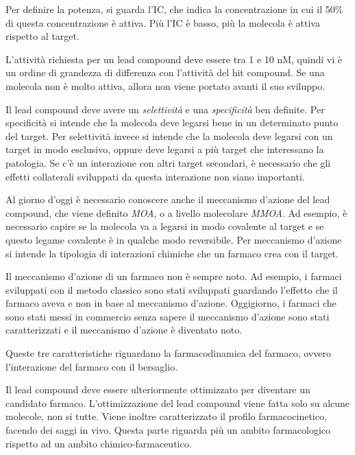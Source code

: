 Per definire la potenza, si guarda l'IC, che indica la
concentrazione in cui il 50\% di questa concentrazione è attiva. Più
l'IC è basso, più la molecola è attiva rispetto al target.

L'attività richiesta per un lead compound deve essere tra 1 e 10 nM,
quindi vi è un ordine di grandezza di differenza con l'attività del hit
compound. Se una molecola non è molto attiva, allora non viene portato
avanti il suo sviluppo.

Il lead compound deve avere un \emph{selettività} e una
\emph{specificità} ben definite. Per specificità si intende che la
molecola deve legarsi bene in un determinato punto del target. Per
selettività invece si intende che la molecola deve legarsi con un target
in modo esclusivo, oppure deve legarsi a più target che interessano la
patologia. Se c'è un interazione con altri target secondari, è
necessario che gli effetti collaterali sviluppati da questa interazione
non siano importanti.

Al giorno d'oggi è necessario conoscere anche il meccanismo d'azione del
lead compound, che viene definito \emph{MOA}, o a livello molecolare
\emph{MMOA}. Ad esempio, è necessario capire se la molecola va a legarsi
in modo covalente al target e se questo legame covalente è in qualche
modo reversibile. Per meccanismo d'azione si intende la tipologia di
interazioni chimiche che un farmaco crea con il target.

Il meccanismo d'azione di un farmaco non è sempre noto. Ad esempio, i
farmaci sviluppati con il metodo classico sono stati sviluppati
guardando l'effetto che il farmaco aveva e non in base al meccanismo
d'azione. Oggigiorno, i farmaci che sono stati messi in commercio senza
sapere il meccanismo d'azione sono stati caratterizzati e il meccanismo
d'azione è diventato noto.

Queste tre caratteristiche riguardano la
farmacodinamica
del farmaco, ovvero l'interazione del farmaco con il bersaglio.

Il lead compound deve essere ulteriormente ottimizzato per diventare un
candidato farmaco. L'ottimizzazione del lead compound viene fatta solo
su alcune molecole, non si tutte. Viene inoltre caratterizzato il
profilo farmacocinetico, facendo dei saggi in vivo. Questa parte
riguarda più un ambito farmacologico rispetto ad un ambito
chimico-farmaceutico.

